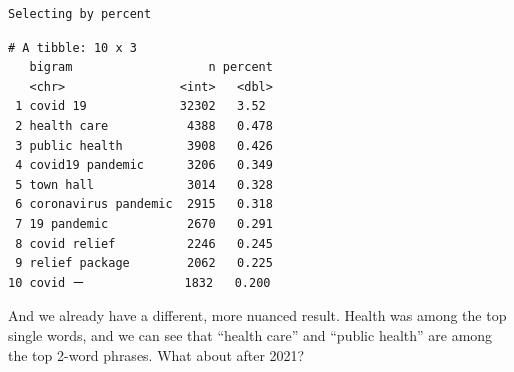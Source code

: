 \documentclass[
  letterpaper,
  DIV=11,
  numbers=noendperiod]{scrreprt}
\newenvironment{Shaded}{\begin{snugshade}}{\end{snugshade}}
\newcommand{\AttributeTok}[1]{\textcolor[rgb]{0.40,0.45,0.13}{#1}}
\newcommand{\ConstantTok}[1]{\textcolor[rgb]{0.56,0.35,0.01}{#1}}
\newcommand{\DecValTok}[1]{\textcolor[rgb]{0.68,0.00,0.00}{#1}}
\newcommand{\FunctionTok}[1]{\textcolor[rgb]{0.28,0.35,0.67}{#1}}
\newcommand{\NormalTok}[1]{\textcolor[rgb]{0.00,0.23,0.31}{#1}}
\newcommand{\SpecialCharTok}[1]{\textcolor[rgb]{0.37,0.37,0.37}{#1}}
\newcommand{\StringTok}[1]{\textcolor[rgb]{0.13,0.47,0.30}{#1}}
\begin{document}
\begin{verbatim}
Selecting by percent
\end{verbatim}

\begin{verbatim}
# A tibble: 10 x 3
   bigram                   n percent
   <chr>                <int>   <dbl>
 1 covid 19             32302   3.52 
 2 health care           4388   0.478
 3 public health         3908   0.426
 4 covid19 pandemic      3206   0.349
 5 town hall             3014   0.328
 6 coronavirus pandemic  2915   0.318
 7 19 pandemic           2670   0.291
 8 covid relief          2246   0.245
 9 relief package        2062   0.225
10 covid ー              1832   0.200
\end{verbatim}

And we already have a different, more nuanced result. Health was among
the top single words, and we can see that ``health care'' and ``public
health'' are among the top 2-word phrases. What about after 2021?

\begin{Shaded}
\end{Shaded}
\end{document}
